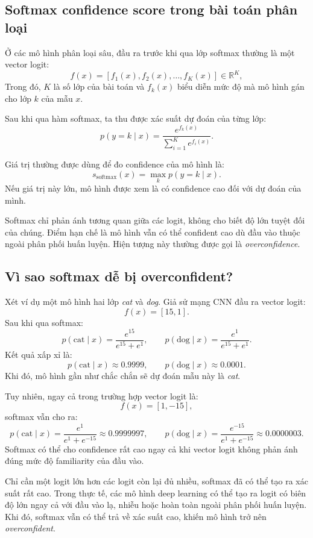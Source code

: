 \documentclass[12pt,a4paper]{article}
\begin{document}
\subsection{Softmax confidence score trong bài toán phân loại}

Ở các mô hình phân loại sâu, đầu ra trước khi qua lớp softmax thường là một vector logit:
\[
f(x) = [f_1(x), f_2(x), \ldots, f_K(x)] \in \mathbb{R}^K,
\]
Trong đó, $K$ là số lớp của bài toán và $f_k(x)$ biểu diễn mức độ mà mô hình gán cho lớp $k$ của mẫu $x$.

Sau khi qua hàm softmax, ta thu được xác suất dự đoán của từng lớp:
\[
p(y=k \mid x) = \frac{e^{f_k(x)}}{\sum_{i=1}^{K} e^{f_i(x)}}.
\]

Giá trị thường được dùng để đo confidence của mô hình là:
\[
s_{\text{softmax}}(x) = \max_{k} p(y=k \mid x).
\]
Nếu giá trị này lớn, mô hình được xem là có confidence cao đối với dự đoán của mình.

Softmax chỉ phản ánh tương quan giữa các logit, không cho biết độ lớn tuyệt đối của chúng. Điểm hạn chế là mô hình vẫn có thể confident cao dù đầu vào thuộc ngoài phân phối huấn luyện. Hiện tượng này thường được gọi là \textit{overconfidence}.

\subsection{Vì sao softmax dễ bị overconfident?}

Xét ví dụ một mô hình hai lớp \textit{cat} và \textit{dog}. Giả sử mạng CNN đầu ra vector logit:
\[
f(x) = [15, 1].
\]
Sau khi qua softmax:
\[
p(\text{cat} \mid x) = \frac{e^{15}}{e^{15} + e^1}, \qquad
p(\text{dog} \mid x) = \frac{e^1}{e^{15} + e^1}.
\]
Kết quả xấp xỉ là:
\[
p(\text{cat} \mid x) \approx 0.9999, \qquad
p(\text{dog} \mid x) \approx 0.0001.
\]
Khi đó, mô hình gần như chắc chắn sẽ dự đoán mẫu này là \textit{cat}.

Tuy nhiên, ngay cả trong trường hợp vector logit là:
\[
f(x) = [1, -15],
\]
softmax vẫn cho ra:
\[
p(\text{cat} \mid x) = \frac{e^1}{e^1 + e^{-15}} \approx 0.9999997, \qquad
p(\text{dog} \mid x) = \frac{e^{-15}}{e^1 + e^{-15}} \approx 0.0000003.
\]
Softmax có thể cho confidence rất cao ngay cả khi vector logit không phản ánh đúng mức độ familiarity của đầu vào.

Chỉ cần một logit lớn hơn các logit còn lại đủ nhiều, softmax đã có thể tạo ra xác suất rất cao. Trong thực tế, các mô hình deep learning có thể tạo ra logit có biên độ lớn ngay cả với đầu vào lạ, nhiễu hoặc hoàn toàn ngoài phân phối huấn luyện. Khi đó, softmax vẫn có thể trả về xác suất cao, khiến mô hình trở nên \textit{overconfident}.
\end{document}
